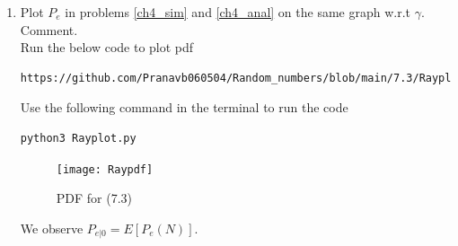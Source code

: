 \documentclass[journal,12pt,twocolumn]{IEEEtran}
\renewcommand\thesection{\arabic{section}}
\begin{document}
\begin{enumerate}[label=\thesection.\arabic*
,ref=\thesection.\theenumi]
\begin{equation}
E\sbrak{g(X)} = \int_{-\infty}^{\infty}g(x)p_{X}(x)\, dx
\end{equation}
%
Find $P_e = E\sbrak{P_e(N)}$.\\
\solution
		\begin{align}
			P_e &= \int_{0}^{\infty}F_A(x)p_{X}(x)dx \\
			&= \int_{0}^{\infty}(1 - e^{-\frac{x^2}{\gamma}})\frac{1}{\sqrt{2\pi}}e^{-\frac{x^2}{2}}dx \\
			&= \frac{1}{2} - \frac{1}{\sqrt{2\pi}}\int_{0}^{\infty}\exp{\brak{-\frac{x^2}{\frac{2\gamma}{\gamma + 2}}}}dx \\
			&= \frac{1}{2}\brak{1 - \sqrt{\frac{\gamma}{\gamma + 2}}}
			\label{eq:jj}
		\end{align}
%
\item
Plot $P_e$ in problems \ref{ch4_sim} and \ref{ch4_anal} on the same graph w.r.t $\gamma$.  Comment.\\
\solution
Run the below code to plot pdf
\begin{lstlisting}
https://github.com/Pranavb060504/Random_numbers/blob/main/7.3/Rayplot.py
\end{lstlisting}
Use the following command in the terminal to run the code
\begin{lstlisting}
python3 Rayplot.py
\end{lstlisting}
\begin{figure}[h]
\texttt{[image: Raypdf]}
\caption{PDF for (7.3)}
\label{fig:PDF7.3}
\end{figure}
We observe $P_{e|0}=E[P_{e}(N)]$.
		\end{enumerate}
\end{document}

